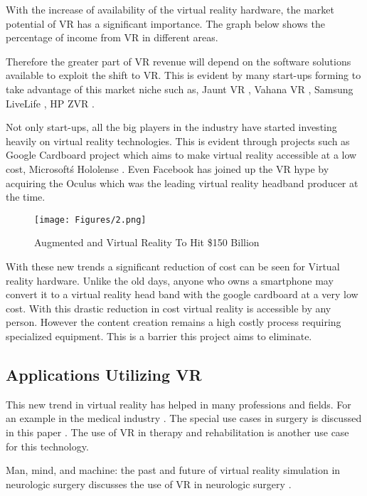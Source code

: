 With the increase of availability of the virtual reality hardware, the market potential of VR has a significant importance. The graph below shows the percentage of income from VR in different areas.

Therefore the greater part of VR revenue will depend on the software solutions available to exploit the shift to VR. This is evident by many start-ups forming to take advantage of this market niche such as, Jaunt VR \cite{jaunt2015}, Vahana VR \cite{vahanvr}, Samsung LiveLife \cite{samsung}, HP ZVR \cite{hpzvr}.

Not only start-ups, all the big players in the industry have started investing heavily on virtual reality technologies. This is evident through projects such as Google Cardboard project \cite{cardboard} which aims to make virtual reality accessible at a low cost, Microsoft\'s Hololense \cite{hololense}. Even Facebook has joined up the VR hype by acquiring the Oculus which was the leading virtual reality headband producer at the time.

\begin{figure}[htbp]
\begin{center}
\texttt{[image: Figures/2.png]}
\caption{Augmented and Virtual Reality To Hit \$150 Billion \cite{techcrunch}}
\label{fig1_2}
\end{center}
\end{figure}

With these new trends a significant reduction of cost can be seen for Virtual reality hardware. Unlike the old days, anyone who owns a smartphone may convert it to a virtual reality head band with the google cardboard at a very low cost. With this drastic reduction in cost virtual reality is accessible by any person. However the content creation remains a high costly process requiring specialized equipment. This is a barrier this project aims to eliminate.

\subsection{Applications Utilizing VR}
\label{intro_subsec:2_2}

This new trend in virtual reality has helped in many professions and fields. For an example in the medical industry \cite{bmj99}. The special use cases in surgery is discussed in this paper \cite{bmj2001}. The use of VR in therapy and rehabilitation is another use case for this technology. 

Man, mind, and machine: the past and future of virtual reality simulation in neurologic surgery discusses the use of VR in neurologic surgery \cite{robinson11}.

